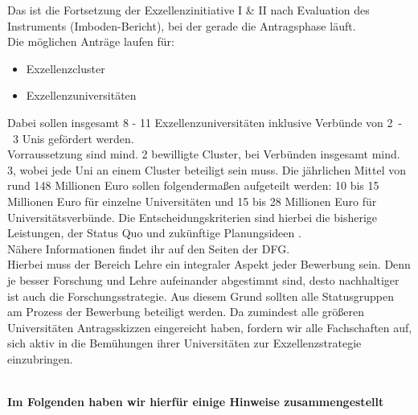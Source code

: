\documentclass[DIV=calc]{scrartcl}
\begin{document}
\begin{minipage}{0.95\textwidth}
Das ist die Fortsetzung der Exzellenzinitiative I \& II nach Evaluation des Instruments (Imboden-Bericht), bei der gerade die Antragsphase läuft.\\
Die möglichen Anträge laufen für:
\begin{itemize}
\item Exzellenzcluster
\item Exzellenzuniversitäten
\end{itemize}
Dabei sollen insgesamt 8 - 11 Exzellenzuniversitäten inklusive Verbünde von \mbox{2 - 3} Unis gefördert
werden.\\
Vorraussetzung sind mind. 2 bewilligte Cluster, bei Verbünden insgesamt mind. 3, wobei jede Uni
an einem Cluster beteiligt sein muss. Die jährlichen Mittel von rund 148 Millionen Euro sollen
folgendermaßen aufgeteilt werden: 10 bis 15 Millionen Euro für einzelne Universitäten und 15 bis
28 Millionen Euro für Universitätsverbünde. Die Entscheidungskriterien sind hierbei die bisherige
Leistungen, der Status Quo und zukünftige Planungsideen \footnotemark[2].\\
Nähere Informationen findet ihr auf den Seiten der DFG\footnotemark[3]\footnotemark[4].\\
Hierbei muss der Bereich Lehre ein integraler Aspekt jeder Bewerbung sein.
Denn je besser Forschung und Lehre aufeinander abgestimmt sind, desto nachhaltiger
ist auch die Forschungsstrategie. Aus diesem Grund sollten alle Statusgruppen am Prozess der
Bewerbung beteiligt werden. Da zumindest alle größeren Universitäten Antragsskizzen eingereicht
haben, fordern wir alle Fachschaften auf, sich aktiv in die Bemühungen ihrer Universitäten zur
Exzellenzstrategie einzubringen.
\end{minipage}\vspace{2\baselineskip}\\
\textbf{Im Folgenden haben wir hierfür einige Hinweise zusammengestellt}\\\\
\begin{minipage}{0.05\textwidth}
~ %
\end{minipage}
\end{document}
